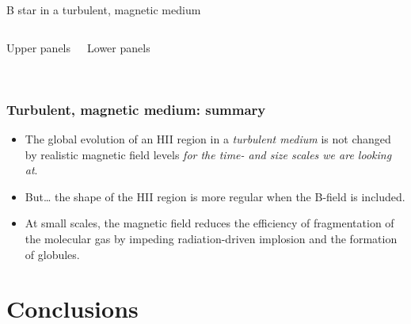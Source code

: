 \documentclass{beamer}
\begin{document}
\begin{frame}{B star in a turbulent, magnetic medium}
  \begin{columns}
    \begin{block}{Upper panels}
      \color{red}{[S\,II]}\quad
      \color{green}{[N\,II]}\quad
      \color{blue}{H\large\bfseries\begin{greek}a\end{greek}}
    \end{block}
    \begin{block}{Lower panels}
      \color{red}{FIR Cold dust}\\
      \color{green}{MIR Warm~PAHs}\\
      \color{blue}{Radio Free-free}
    \end{block}
  \end{columns}
\end{frame}

\begin{frame}
  \frametitle{Turbulent, magnetic medium: summary}
  \linespread{1.3}\selectfont
  \begin{itemize}
  \item The global evolution of an HII region in a \textit{turbulent
      medium} is not changed by 
    realistic magnetic field levels \textit{\alert{for the time- and
        size scales we are looking at}}.
  \item But\dots 
    the shape of the HII region is more regular when the B-field is included.
  \item At small scales, the magnetic field
    reduces the efficiency of fragmentation of the molecular gas by impeding
    radiation-driven implosion and the formation of globules.
  \end{itemize}
\end{frame}


\section{Conclusions}
\end{document}
